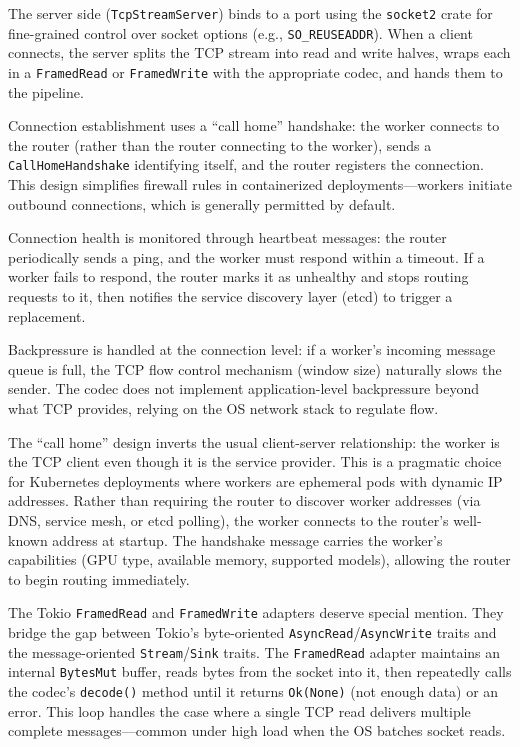 The server side (\texttt{TcpStreamServer}) binds to a port using the \texttt{socket2} crate for fine-grained control over socket options (e.g., \texttt{SO\_REUSEADDR}). When a client connects, the server splits the TCP stream into read and write halves, wraps each in a \texttt{FramedRead} or \texttt{FramedWrite} with the appropriate codec, and hands them to the pipeline.

Connection establishment uses a ``call home'' handshake: the worker connects to the router (rather than the router connecting to the worker), sends a \texttt{CallHomeHandshake} identifying itself, and the router registers the connection. This design simplifies firewall rules in containerized deployments---workers initiate outbound connections, which is generally permitted by default.

Connection health is monitored through heartbeat messages: the router periodically sends a ping, and the worker must respond within a timeout. If a worker fails to respond, the router marks it as unhealthy and stops routing requests to it, then notifies the service discovery layer (etcd) to trigger a replacement.

Backpressure is handled at the connection level: if a worker's incoming message queue is full, the TCP flow control mechanism (window size) naturally slows the sender. The codec does not implement application-level backpressure beyond what TCP provides, relying on the OS network stack to regulate flow.

\begin{insightbox}
The ``call home'' design inverts the usual client-server relationship: the worker is the TCP client even though it is the service provider. This is a pragmatic choice for Kubernetes deployments where workers are ephemeral pods with dynamic IP addresses. Rather than requiring the router to discover worker addresses (via DNS, service mesh, or etcd polling), the worker connects to the router's well-known address at startup. The handshake message carries the worker's capabilities (GPU type, available memory, supported models), allowing the router to begin routing immediately.
\end{insightbox}

The Tokio \texttt{FramedRead} and \texttt{FramedWrite} adapters deserve special mention. They bridge the gap between Tokio's byte-oriented \texttt{AsyncRead}/\texttt{AsyncWrite} traits and the message-oriented \texttt{Stream}/\texttt{Sink} traits. The \texttt{FramedRead} adapter maintains an internal \texttt{BytesMut} buffer, reads bytes from the socket into it, then repeatedly calls the codec's \texttt{decode()} method until it returns \texttt{Ok(None)} (not enough data) or an error. This loop handles the case where a single TCP read delivers multiple complete messages---common under high load when the OS batches socket reads.

